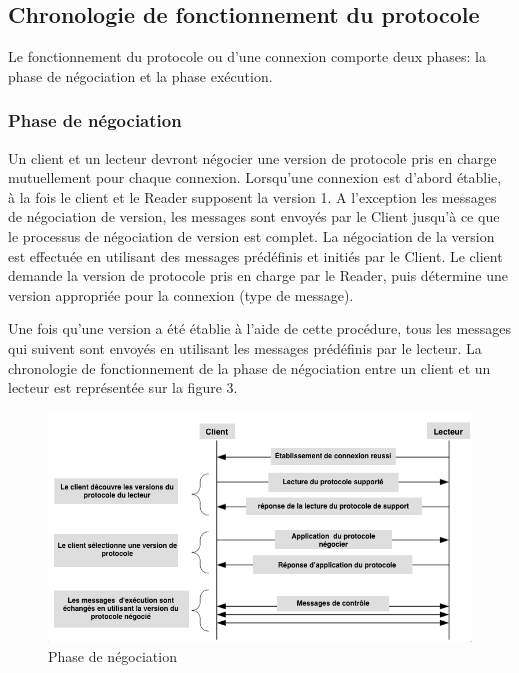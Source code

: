 \documentclass[11pt, a4paper, twoside]{book}
\begin{document}
\subsection{Chronologie de fonctionnement du protocole}
Le fonctionnement du protocole ou d'une connexion comporte deux phases: la phase de négociation et la phase exécution.
\subsubsection{Phase de négociation}
Un client et un lecteur devront négocier une version de protocole pris en charge mutuellement pour chaque connexion. Lorsqu'une connexion  est d'abord établie, à la fois le client et le Reader supposent  la version 1. A l'exception les messages de négociation de version, les messages sont envoyés par le Client  jusqu'à ce que le processus de négociation de version est complet. La négociation de la version est effectuée en utilisant des messages prédéfinis et initiés par le Client. Le client demande la version de protocole pris en charge par le Reader, puis détermine une version appropriée pour la connexion (type de message).
 
Une fois qu'une version a été établie à l'aide de cette procédure, tous les messages qui suivent sont envoyés en utilisant les messages prédéfinis par le lecteur. La chronologie de fonctionnement de la phase de négociation  entre un client et un lecteur est représentée sur la figure 3.
\begin{figure}[!h]
\centering
\includegraphics[width=\textwidth]{negotiation2}
\caption{Phase de négociation}
\end{figure}
\end{document}
